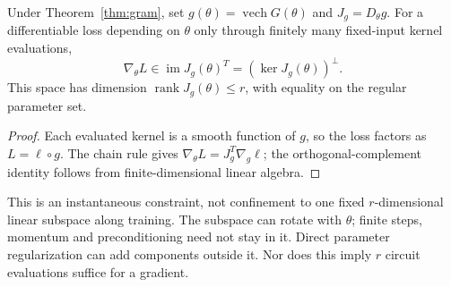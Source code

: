 \begin{corollary}
\label{cor:gradientspace}
Under Theorem~\ref{thm:gram}, set $g(\theta)=\operatorname{vech}G(\theta)$
and $J_g=D_\theta g$. For a differentiable loss depending on $\theta$
only through finitely many fixed-input kernel evaluations,
\begin{equation}
 \nabla_\theta L\in\operatorname{im}J_g(\theta)^T
       =(\ker J_g(\theta))^\perp.
\end{equation}
This space has dimension $\operatorname{rank}J_g(\theta)\le r$,
with equality on the regular parameter set.
\end{corollary}
\begin{proof}
Each evaluated kernel is a smooth function of $g$, so the loss factors
as $L=\ell\circ g$. The chain rule gives
$\nabla_\theta L=J_g^T\nabla_g\ell$; the orthogonal-complement
identity follows from finite-dimensional linear algebra.
\end{proof}
This is an instantaneous constraint, not confinement to one fixed
$r$-dimensional linear subspace along training. The subspace can rotate
with $\theta$; finite steps, momentum and preconditioning need not stay
in it. Direct parameter regularization can add components outside it.
Nor does this imply $r$ circuit evaluations suffice for a gradient.
